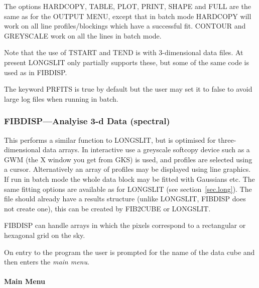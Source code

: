The options HARDCOPY, TABLE, PLOT, PRINT, SHAPE and FULL are the same
as for the OUTPUT MENU, except that in batch mode HARDCOPY
will work on all line profiles/blockings which have a successful fit.
CONTOUR and GREYSCALE work on all the lines in batch mode.

Note that the use of TSTART and TEND is with 3-dimensional data files.
At present LONGSLIT only partially supports these, but some of the same
code is used as in FIBDISP.

The keyword PRFITS is true by default but the user may set it to false
to avoid large log files when running in batch.

\subsubsection{%
FIBDISP---Analyise 3-d Data (spectral)}

This performs a similar function to LONGSLIT, but is optimised for
three-dimensional data arrays.
In interactive use a greyscale softcopy device such as a GWM (the X
window you get from GKS) is used, and profiles are selected using a cursor.
Alternatively an
array of profiles may be displayed using line graphics. If run in batch
mode the whole data block may be fitted with Gaussians etc. The same
fitting options are available as for LONGSLIT (see
section~\ref{sec.long}). The file should already have a results
structure (unlike LONGSLIT, FIBDISP does not create one), this can be
created by FIB2CUBE or LONGSLIT.

FIBDISP can handle arrays in which the pixels correspond to a
rectangular or hexagonal grid on the sky.

On entry to the program the user is prompted for the name of the data
cube and then enters the {\em main menu}.

\paragraph{Main Menu}

